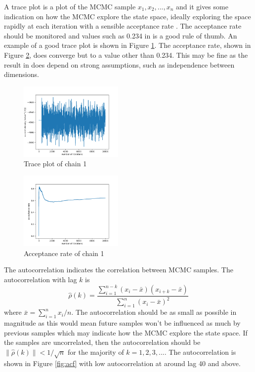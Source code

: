 \documentclass[10pt]{proc}
\newcommand{\dotdotdot}{...}
\begin{document}
A trace plot is a plot of the MCMC sample $x_1,x_2,\dotdotdot,x_n$ and it gives some indication on how the MCMC explore the state space, ideally exploring the space rapidly at each iteration with a sensible acceptance rate \citep{rosenthal2011optimal}. The acceptance rate should be monitored and values such as 0.234 in \cite{roberts1997weak} is a good rule of thumb. An example of a good trace plot is shown in Figure \ref{fig:trace}. The acceptance rate, shown in Figure \ref{fig:accept}, does converge but to a value other than 0.234. This may be fine as the result in \cite{roberts1997weak} does depend on strong assumptions, such as independence between dimensions.

\begin{figure}[ht]
  \centering
  \includegraphics[width=0.45\textwidth]{chain_1.png}
  \caption{Trace plot of chain 1}
  \label{fig:trace}
\end{figure}
\begin{figure}[ht]
  \centering
  \includegraphics[width=0.45\textwidth]{accept.png}
  \caption{Acceptance rate of chain 1}
  \label{fig:accept}
\end{figure}

The autocorrelation \citep{geyer2011mcmc} indicates the correlation between MCMC samples. The autocorrelation with lag $k$ is
\begin{equation}
\widehat{\rho}(k)=\dfrac
{
  \sum_{i=1}^{n-k}(x_i-\bar{x})(x_{i+k}-\bar{x})
}
{
  \sum_{i=1}^{n}(x_i-\bar{x})^2
}
\end{equation}
where $\bar{x}=\sum_{i=1}^nx_i/n$. The autocorrelation should be as small as possible in magnitude as this would mean future samples won't be influenced as much by previous samples which may indicate how the MCMC explore the state space. If the samples are uncorrelated, then the autocorrelation should be $\|\widehat{\rho}(k)\|<1/\sqrt{n}$ for the majority of $k=1,2,3,\dotdotdot$. The autocorrelation is shown in Figure \ref{fig:acf} with low autocorrelation at around lag 40 and above.
\end{document}
